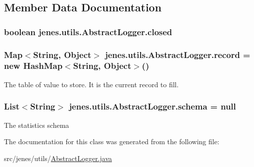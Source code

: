 \subsection{Member Data Documentation}
\hypertarget{classjenes_1_1utils_1_1_abstract_logger_a68fe91d1c7bad9146db3bddd92bbcab3}{
\subsubsection[{closed}]{\setlength{\rightskip}{0pt plus 5cm}boolean jenes.\-utils.\-Abstract\-Logger.\-closed\hspace{0.3cm}{\ttfamily [protected]}}}\label{classjenes_1_1utils_1_1_abstract_logger_a68fe91d1c7bad9146db3bddd92bbcab3}
\hypertarget{classjenes_1_1utils_1_1_abstract_logger_ae85e356ad12255a9c5ec8f9f25659ef7}{
\subsubsection[{record}]{\setlength{\rightskip}{0pt plus 5cm}Map$<$String, Object$>$ jenes.\-utils.\-Abstract\-Logger.\-record = new Hash\-Map$<$String, Object$>$()\hspace{0.3cm}{\ttfamily [protected]}}}\label{classjenes_1_1utils_1_1_abstract_logger_ae85e356ad12255a9c5ec8f9f25659ef7}
The table of value to store. It is the current record to fill. \hypertarget{classjenes_1_1utils_1_1_abstract_logger_a3a2030876857a0512fae7e0ad400c570}{
\subsubsection[{schema}]{\setlength{\rightskip}{0pt plus 5cm}List$<$String$>$ jenes.\-utils.\-Abstract\-Logger.\-schema = null\hspace{0.3cm}{\ttfamily [protected]}}}\label{classjenes_1_1utils_1_1_abstract_logger_a3a2030876857a0512fae7e0ad400c570}
The statistics schema 

The documentation for this class was generated from the following file\-:\begin{DoxyCompactItemize}
\item 
src/jenes/utils/\hyperlink{_abstract_logger_8java}{Abstract\-Logger.\-java}\end{DoxyCompactItemize}
